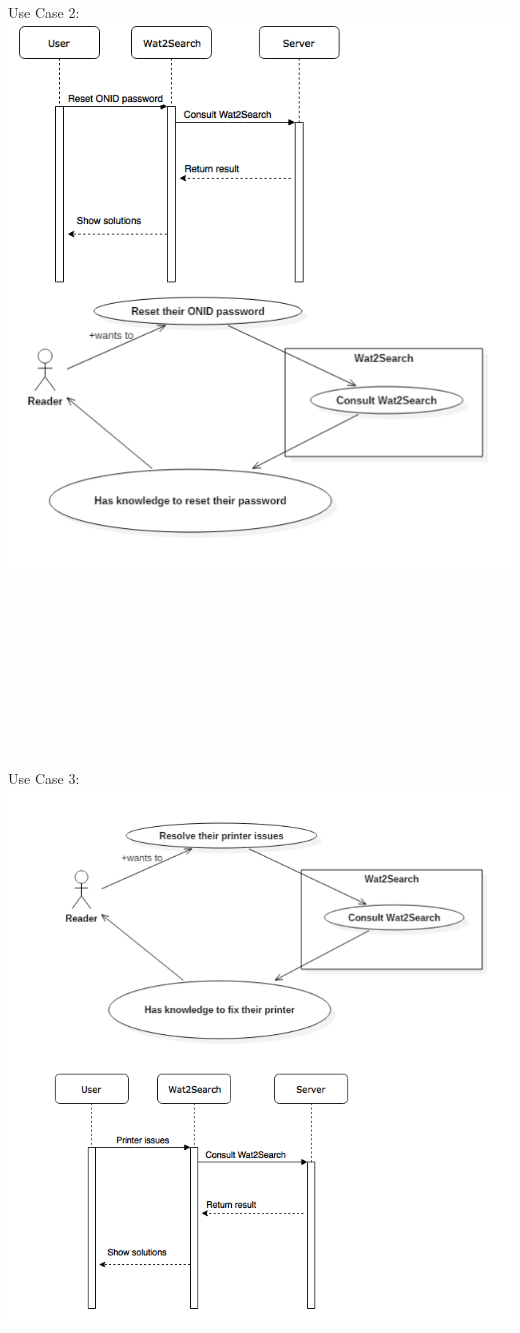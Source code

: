 \documentclass[12pt, letterpaper]{article}
\begin{document}
\\\\Use Case 2:
\\\includegraphics[scale=.75]{use_case2.png}
\\\\\\\\\\\\\\\\\\\\\\Use Case 3:
\\\includegraphics[scale=.75]{use_case3.png}
\end{document}
